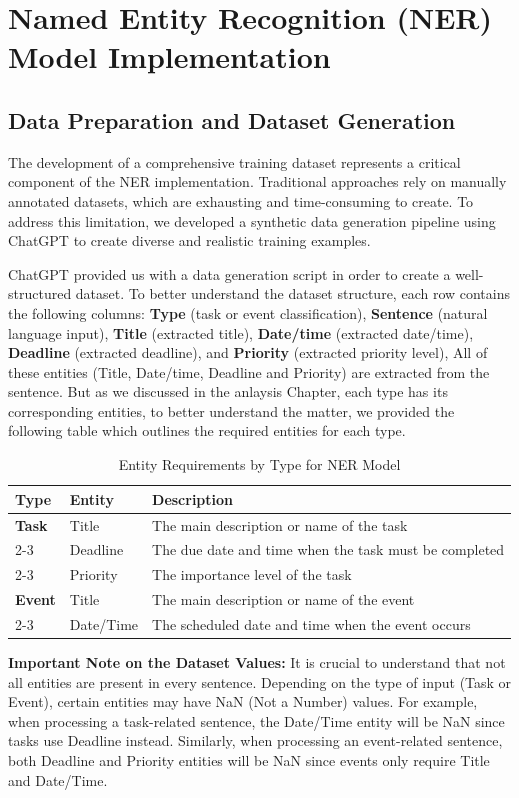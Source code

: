\documentclass[12pt,a4paper]{article}
\begin{document}
\section{Named Entity Recognition (NER) Model Implementation}

\subsection{Data Preparation and Dataset Generation}

The development of a comprehensive training dataset represents a critical component of the NER implementation. Traditional approaches rely on manually annotated datasets, which are exhausting and time-consuming to create. To address this limitation, we developed a synthetic data generation pipeline using ChatGPT to create diverse and realistic training examples.


ChatGPT provided us with a data generation script in order to create a well-structured dataset. To better understand the dataset structure, each row contains the following columns: \textbf{Type} (task or event classification), \textbf{Sentence} (natural language input), \textbf{Title} (extracted title), \textbf{Date/time} (extracted date/time), \textbf{Deadline} (extracted deadline), and \textbf{Priority} (extracted priority level), All of these entities (Title, Date/time, Deadline and Priority) are extracted from the sentence. But as we discussed in the anlaysis Chapter, each type has its corresponding entities, to better understand the matter, we provided the following table which outlines the required entities for each type.

\begin{table}[H]
\centering
\begin{tabular}{|l|l|p{}|}
\hline
\textbf{Type} & \textbf{Entity} & \textbf{Description} \\
\hline
\textbf{Task} & Title & The main description or name of the task \\
\cline{2-3}
& Deadline & The due date and time when the task must be completed \\
\cline{2-3}
& Priority & The importance level of the task \\
\hline
\textbf{Event} & Title & The main description or name of the event \\
\cline{2-3}
& Date/Time & The scheduled date and time when the event occurs \\
\hline
\end{tabular}
\caption{Entity Requirements by Type for NER Model}
\end{table}
\textbf{Important Note on the Dataset Values:} It is crucial to understand that not all entities are present in every sentence. Depending on the type of input (Task or Event), certain entities may have NaN (Not a Number) values. For example, when processing a task-related sentence, the Date/Time entity will be NaN since tasks use Deadline instead. Similarly, when processing an event-related sentence, both Deadline and Priority entities will be NaN since events only require Title and Date/Time.
\end{document}
